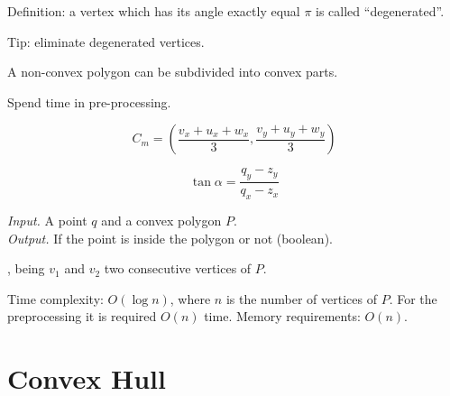 \documentclass[twoside,12pt, a4paper]{memoir}
\begin{document}
Definition: a vertex which has its angle exactly equal $\pi$ is called ``degenerated''.

Tip: eliminate degenerated vertices.

A non-convex polygon can be subdivided into convex parts.

Spend time in pre-processing.

\begin{equation}
  \label{center-mass}
  C_{m} = \left ( \dfrac{v_{x} + u_{x} + w_{x}}{3}, \dfrac{v_{y} + u_{y} + w_{y}}{3} \right )
\end{equation}

\begin{equation}
  \label{tangent}
  \tan{\alpha} = \dfrac{q_{y} - z_{y}}{q_{x} - z_{x}}
\end{equation}



\begin{algorithm}
  \caption{$PointInclusionInConvexPolygon(q, P)$}
  \textit{Input.} A point $q$ and a convex polygon $P$. \\
  \textit{Output.} If the point is inside the polygon or not (boolean).
  \begin{algorithmic}[1]

    \EndFor{}

    , being $v_{1}$ and $v_{2}$ two consecutive vertices of $P$.

    \Else{}
    \EndIf{}

  \end{algorithmic}
\end{algorithm}

Time complexity: $O(\log{n})$, where $n$ is the number of vertices of $P$. For the preprocessing it is required $O(n)$ time. Memory requirements: $O(n)$.


\chapter{Convex Hull}
\end{document}
